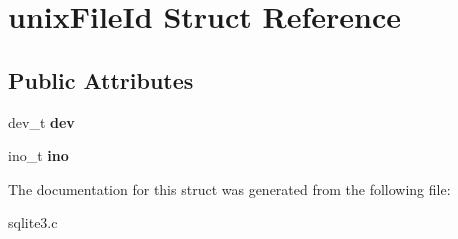 \hypertarget{structunix_file_id}{\section{unix\-File\-Id Struct Reference}
\label{structunix_file_id}
}
\subsection*{Public Attributes}
\begin{DoxyCompactItemize}
\item 
\hypertarget{structunix_file_id_acf703d95b9a1ae2f34affb7e9ae45e1b}{dev\-\_\-t {\bfseries dev}}\label{structunix_file_id_acf703d95b9a1ae2f34affb7e9ae45e1b}

\item 
\hypertarget{structunix_file_id_a2cc2d43e9d3f0a60810daa8fc353e692}{ino\-\_\-t {\bfseries ino}}\label{structunix_file_id_a2cc2d43e9d3f0a60810daa8fc353e692}

\end{DoxyCompactItemize}


The documentation for this struct was generated from the following file\-:\begin{DoxyCompactItemize}
\item 
sqlite3.\-c\end{DoxyCompactItemize}
